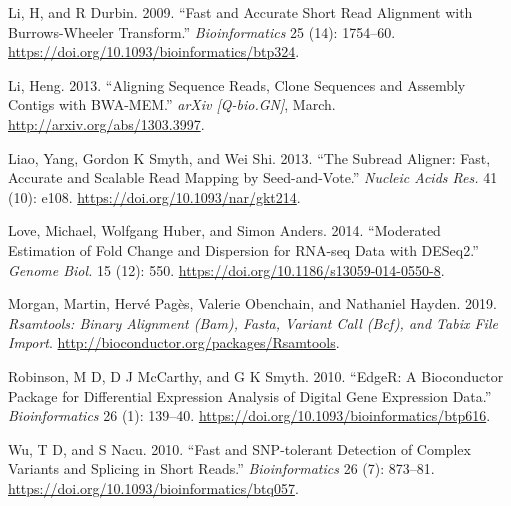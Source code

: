 \documentclass[14pt,]{article}
\begin{document}
\leavevmode\hypertarget{ref-Li2009-oc}{}%
Li, H, and R Durbin. 2009. ``Fast and Accurate Short Read Alignment with Burrows-Wheeler Transform.'' \emph{Bioinformatics} 25 (14): 1754--60. \url{https://doi.org/10.1093/bioinformatics/btp324}.

\leavevmode\hypertarget{ref-Li2013-oy}{}%
Li, Heng. 2013. ``Aligning Sequence Reads, Clone Sequences and Assembly Contigs with BWA-MEM.'' \emph{arXiv {[}Q-bio.GN{]}}, March. \url{http://arxiv.org/abs/1303.3997}.

\leavevmode\hypertarget{ref-Liao2013-bn}{}%
Liao, Yang, Gordon K Smyth, and Wei Shi. 2013. ``The Subread Aligner: Fast, Accurate and Scalable Read Mapping by Seed-and-Vote.'' \emph{Nucleic Acids Res.} 41 (10): e108. \url{https://doi.org/10.1093/nar/gkt214}.

\leavevmode\hypertarget{ref-Love2014-sh}{}%
Love, Michael, Wolfgang Huber, and Simon Anders. 2014. ``Moderated Estimation of Fold Change and Dispersion for RNA-seq Data with DESeq2.'' \emph{Genome Biol.} 15 (12): 550. \url{https://doi.org/10.1186/s13059-014-0550-8}.

\leavevmode\hypertarget{ref-Rsamtools}{}%
Morgan, Martin, Hervé Pagès, Valerie Obenchain, and Nathaniel Hayden. 2019. \emph{Rsamtools: Binary Alignment (Bam), Fasta, Variant Call (Bcf), and Tabix File Import}. \url{http://bioconductor.org/packages/Rsamtools}.

\leavevmode\hypertarget{ref-Robinson2010-uk}{}%
Robinson, M D, D J McCarthy, and G K Smyth. 2010. ``EdgeR: A Bioconductor Package for Differential Expression Analysis of Digital Gene Expression Data.'' \emph{Bioinformatics} 26 (1): 139--40. \url{https://doi.org/10.1093/bioinformatics/btp616}.

\leavevmode\hypertarget{ref-Wu2010-iq}{}%
Wu, T D, and S Nacu. 2010. ``Fast and SNP-tolerant Detection of Complex Variants and Splicing in Short Reads.'' \emph{Bioinformatics} 26 (7): 873--81. \url{https://doi.org/10.1093/bioinformatics/btq057}.
\end{document}
